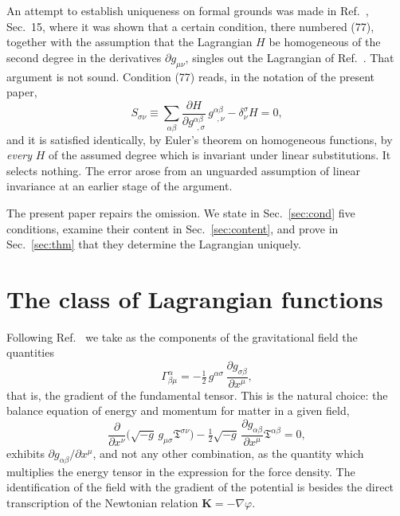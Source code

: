 \documentclass[aps,prd,reprint,amsmath,amssymb,nofootinbib,longbibliography]{revtex4-2}
\newcommand{\Gam}[3]{\Gamma^{#1}_{#2#3}}
\begin{document}
An attempt to establish uniqueness on formal grounds was made in Ref.~\cite{ein1914}, Sec.~15, where
it was shown that a certain condition, there numbered (77), together with the assumption that the
Lagrangian $H$ be homogeneous of the second degree in the derivatives $\partial g_{\mu\nu}$, singles
out the Lagrangian of Ref.~\cite{eingross1913}. That argument is not sound. Condition (77) reads,
in the notation of the present paper,
\begin{equation}
S_{\sigma\nu} \equiv \sum_{\alpha\beta}
   \frac{\partial H}{\partial g^{\alpha\beta}_{\ \ ,\sigma}}\, g^{\alpha\beta}_{\ \ ,\nu}
   - \delta^{\sigma}_{\nu} H = 0 ,
\label{eq:S}
\end{equation}
and it is satisfied identically, by Euler's theorem on homogeneous functions, by \emph{every}
$H$ of the assumed degree which is invariant under linear substitutions. It selects nothing. The
error arose from an unguarded assumption of linear invariance at an earlier stage of the argument.

The present paper repairs the omission. We state in Sec.~\ref{sec:cond} five conditions, examine
their content in Sec.~\ref{sec:content}, and prove in Sec.~\ref{sec:thm} that they determine the
Lagrangian uniquely.

\section{The class of Lagrangian functions}

Following Ref.~\cite{eingross1913} we take as the components of the gravitational field the
quantities
\begin{equation}
\Gam{\alpha}{\beta}{\mu} = -\tfrac{1}{2}\, g^{\alpha\sigma}\,
   \frac{\partial g_{\sigma\beta}}{\partial x^{\mu}} ,
\label{eq:Gamma}
\end{equation}
that is, the gradient of the fundamental tensor. This is the natural choice: the balance equation of
energy and momentum for matter in a given field,
\begin{equation}
\frac{\partial}{\partial x^{\nu}}
   \big( \sqrt{-g}\, g_{\mu\sigma} \mathfrak{T}^{\sigma\nu} \big)
- \tfrac{1}{2}\sqrt{-g}\,
   \frac{\partial g_{\alpha\beta}}{\partial x^{\mu}} \mathfrak{T}^{\alpha\beta} = 0 ,
\label{eq:balance}
\end{equation}
exhibits $\partial g_{\alpha\beta}/\partial x^{\mu}$, and not any other combination, as the quantity
which multiplies the energy tensor in the expression for the force density. The identification of
the field with the gradient of the potential is besides the direct transcription of the Newtonian
relation $\bm K = -\nabla\varphi$.
\end{document}
